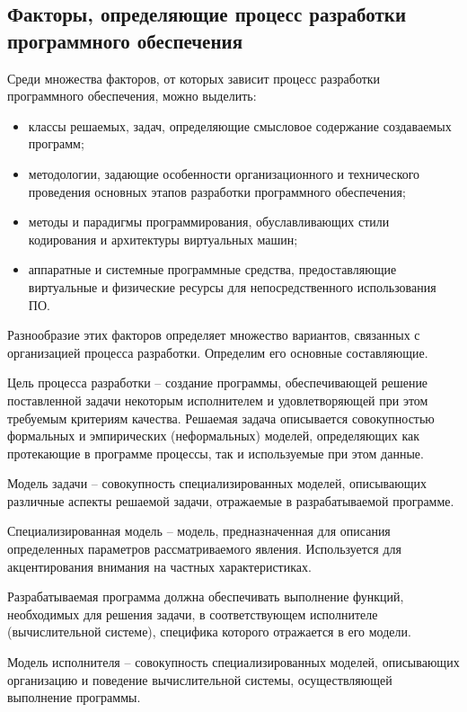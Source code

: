 \subsection{Факторы, определяющие процесс разработки программного обеспечения}

Среди множества факторов, от которых зависит процесс разработки программного обеспечения, можно выделить:

\begin{itemize}
    \item классы решаемых, задач, определяющие смысловое содержание создаваемых программ;
    \item методологии, задающие особенности организационного и технического проведения основных этапов разработки программного обеспечения;
    \item методы и парадигмы программирования, обуславливающих стили кодирования и архитектуры виртуальных машин;
    \item аппаратные и системные программные средства, предоставляющие виртуальные и физические ресурсы для непосредственного использования ПО.
\end{itemize}


Разнообразие этих факторов определяет множество вариантов, связанных с организацией процесса разработки. Определим его основные составляющие.

Цель процесса разработки – создание программы, обеспечивающей решение поставленной задачи некоторым исполнителем и удовлетворяющей при этом требуемым критериям качества. Решаемая задача описывается совокупностью формальных и эмпирических (неформальных) моделей, определяющих как протекающие в программе процессы, так и используемые при этом данные.

Модель задачи – совокупность специализированных моделей, описывающих различные аспекты решаемой задачи, отражаемые в разрабатываемой программе.

Специализированная модель – модель, предназначенная для описания определенных параметров рассматриваемого явления. Используется для акцентирования внимания на частных характеристиках.

Разрабатываемая программа должна обеспечивать выполнение функций, необходимых для решения задачи, в соответствующем исполнителе (вычислительной системе), специфика которого отражается в его модели.

Модель исполнителя – совокупность специализированных моделей, описывающих организацию и поведение вычислительной системы, осуществляющей выполнение программы.

